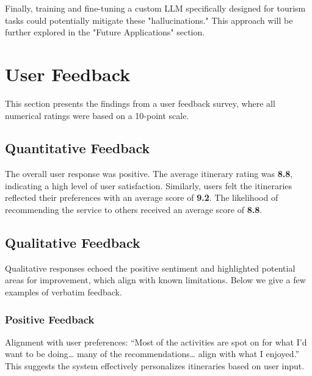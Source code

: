 \documentclass[12pt,a4paper]{report}
\begin{document}
Finally, training and fine-tuning a custom LLM specifically designed for tourism tasks could potentially mitigate these "hallucinations." This approach will be further explored in the "Future Applications" section.

\section{User Feedback}

This section presents the findings from a user feedback survey, where all numerical ratings were based on a 10-point scale.

\subsection{Quantitative Feedback}

The overall user response was positive. The average itinerary rating was \textbf{8.8}, indicating a high level of user satisfaction. Similarly, users felt the itineraries reflected their preferences with an average score of \textbf{9.2}. The likelihood of recommending the service to others received an average score of \textbf{8.8}.

\subsection{Qualitative Feedback}

Qualitative responses echoed the positive sentiment and highlighted potential areas for improvement, which align with known limitations. Below we give a few examples of verbatim feedback.

\subsubsection{Positive Feedback}

Alignment with user preferences: “Most of the activities are spot on for what I'd want to be doing… many of the recommendations… align with what I enjoyed.” This suggests the system effectively personalizes itineraries based on user input. 
\end{document}
